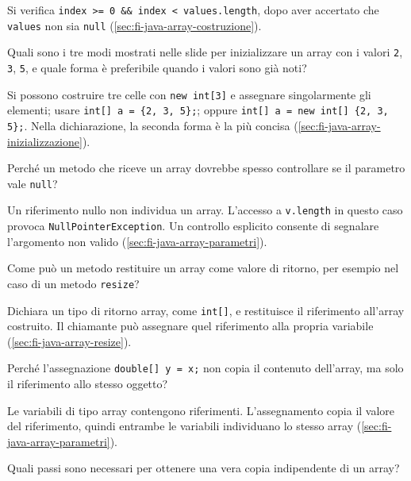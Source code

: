 Si verifica \texttt{index >= 0 \&\& index < values.length},
dopo aver accertato che \texttt{values} non sia \texttt{null}
(\cref{sec:fi-java-array-costruzione}).

\begin{exercise}
\label{ex:fi-esercizi-array-inizializzazione}
Quali sono i tre modi mostrati nelle slide per inizializzare un array
con i valori \texttt{2}, \texttt{3}, \texttt{5}, e quale forma è
preferibile quando i valori sono già noti?
\end{exercise}

Si possono costruire tre celle con \texttt{new int[3]} e assegnare
singolarmente gli elementi; usare \texttt{int[] a = \{2, 3, 5\};};
oppure \texttt{int[] a = new int[] \{2, 3, 5\};}.
Nella dichiarazione, la seconda forma è la più concisa
(\cref{sec:fi-java-array-inizializzazione}).

\begin{exercise}
\label{ex:fi-esercizi-array-null}
Perché un metodo che riceve un array dovrebbe spesso controllare
se il parametro vale \texttt{null}?
\end{exercise}

Un riferimento nullo non individua un array.
L'accesso a \texttt{v.length} in questo caso provoca
\texttt{NullPointerException}. Un controllo esplicito
consente di segnalare l'argomento non valido (\cref{sec:fi-java-array-parametri}).

\begin{exercise}
\label{ex:fi-esercizi-array-ritorno}
Come può un metodo restituire un array come valore di ritorno,
per esempio nel caso di un metodo \texttt{resize}?
\end{exercise}

Dichiara un tipo di ritorno array, come \texttt{int[]}, e
restituisce il riferimento all'array costruito. Il chiamante può
assegnare quel riferimento alla propria variabile
(\cref{sec:fi-java-array-resize}).

\begin{exercise}
\label{ex:fi-esercizi-array-alias}
Perché l'assegnazione \texttt{double[] y = x;} non copia il
contenuto dell'array, ma solo il riferimento allo stesso oggetto?
\end{exercise}

Le variabili di tipo array contengono riferimenti. L'assegnamento
copia il valore del riferimento, quindi entrambe le variabili
individuano lo stesso array
(\cref{sec:fi-java-array-parametri}).

\begin{exercise}
\label{ex:fi-esercizi-array-copia}
Quali passi sono necessari per ottenere una vera copia
indipendente di un array?
\end{exercise}

